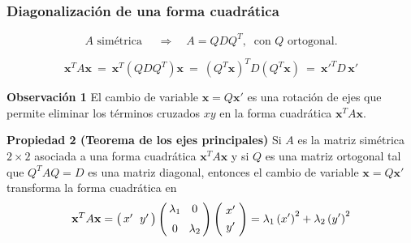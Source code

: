 {\nologo 
\begin{frame}\frametitle{Diagonalización de una forma cuadrática}
	
	\[
	A \text{ simétrica } \quad  \Longrightarrow \quad A = QDQ^T, \ \text{ con } Q \text{ ortogonal.}
	\]
	
	\smallskip
	\[
	\mathbf{x}^TA \mathbf{x} \ = \
	\mathbf{x}^T\left(QDQ^T \right) \mathbf{x} \ = \
	\left(Q^T\mathbf{x}\right)^T D\left(Q^T\mathbf{x}\right) \ = \
	\mathbf{x'}^TD\, \mathbf{x'}
	\]
	
	\vspace{0mm}
	\begin{alertblock}{\textbf{Observación 1}}
		El cambio de variable $\mathbf{x} = Q\mathbf{x'}$ es una rotación de ejes que permite eliminar los términos 
		cruzados $xy$ en la forma cuadrática $\mathbf{x}^TA \mathbf{x}$.
	\end{alertblock}	
	
	\vspace{0mm}
	\begin{prop}{\textbf{Propiedad 2 (Teorema de los ejes principales)}}\justifying 
		Si $A$ es la matriz simétrica $2\times 2$ asociada a una forma cuadrática $\mathbf{x}^TA \mathbf{x}$ 
		y si $Q$ es una matriz ortogonal tal que $Q^TAQ = D$ es una matriz diagonal, entonces el cambio de variable $\mathbf{x}=Q\mathbf{x'}$ transforma la forma cuadrática en
		\[
		\mathbf{x}^TA \mathbf{x} = 
		\left(
		\begin{array}{@{\hspace{0.3\tabcolsep}}c@{\hspace{\tabcolsep}}c@{\hspace{0.3\tabcolsep}}}
		x' & y'  
		\end{array}
		\right)
		\left(
		\begin{array}{@{\hspace{0.3\tabcolsep}}c@{\hspace{1.2\tabcolsep}}c@{\hspace{0.3\tabcolsep}}}
		\lambda_1 & 0   \\[2mm]
		0 & \lambda_2
		\end{array}
		\right)
		\left(
		\begin{array}{@{\hspace{0.5\tabcolsep}}c@{\hspace{0.5\tabcolsep}}}
		x'   \\[1mm]
		y'
		\end{array}
		\right)
		=				
		\lambda_1\left(x'\right)^2 + \lambda_2\left(y'\right)^2
		\]
	\end{prop}
	
\end{frame}
}

